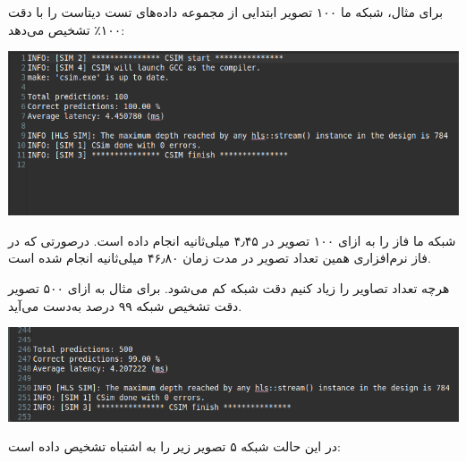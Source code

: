 \begin{qsolve}
	برای مثال، شبکه ما ۱۰۰ تصویر ابتدایی از مجموعه داده‌های تست دیتاست  را با دقت ۱۰۰٪ تشخیص می‌دهد:
	
	\begin{center}
		\includegraphics*[width=1\linewidth]{pics/output_predict_100.png}
		\label{Accuracy پیش‌بینی به‌ازای ۱۰۰ تصویر}
	\end{center}
	
	شبکه ما فاز  را به ازای ۱۰۰ تصویر در ۴٫۴۵ میلی‌ثانیه انجام داده است. درصورتی که در فاز نرم‌افزاری همین تعداد تصویر در مدت زمان ۴۶٫۸۰ میلی‌ثانیه انجام شده است.
	
	
	هرچه تعداد تصاویر را زیاد کنیم دقت شبکه کم می‌شود. برای مثال به ازای ۵۰۰ تصویر دقت تشخیص شبکه ۹۹ درصد به‌دست می‌آید.
	
	\begin{center}
		\includegraphics*[width=1\linewidth]{pics/output_predict_500.png}
		\label{Accuracy پیش‌بینی به‌ازای ۵۰۰ تصویر}
	\end{center}
	
	در این حالت شبکه ۵ تصویر زیر را به اشتباه تشخیص داده است:
\end{qsolve}
\newpage


